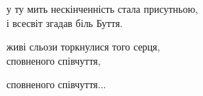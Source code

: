 у ту мить нескінченність стала присутньою,\\
і всесвіт згадав біль Буття.

живі сльози торкнулися того серця,\\
сповненого співчуття,

сповненого співчуття...

